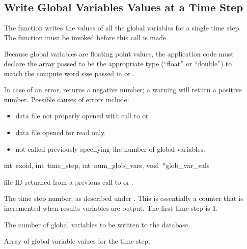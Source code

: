 \subsection{Write Global Variables Values at a Time Step}

The function  writes the values of all the
global variables for a single time step. The function
 must be invoked before this call is made.

Because global variables are floating point values, the application
code must declare the array passed to be the appropriate type
(``float'' or ``double'') to match the compute word size passed in
 or .

In case of an error,  returns a negative
number; a warning will return a positive number. Possible causes of
errors include:

\begin{itemize}
 \item data file not properly opened with call to 
 or 

 \item data file opened for read only.

 \item {} not called previously specifying
 the number of global variables.
\end{itemize}

{int~exoid, 
int~time_step, 
int~num_glob_vars,
void~*glob_var_vals}

\begin{parameters}
\item[{int exoid \R{}}]
\exo{} file ID returned from a previous call to  
or .

\item[{int time_step \R{}}]
The time step number, as described under . 
This is essentially a counter that is incremented when results 
variables are output. The first time step is 1.

\item[{int num_glob_vars \R{}}]
The number of global variables to be written to the database.

\item[{void* glob_var_vals \R{}}]
Array of  global variable values for 
the \th{} time step.
\end{parameters}

